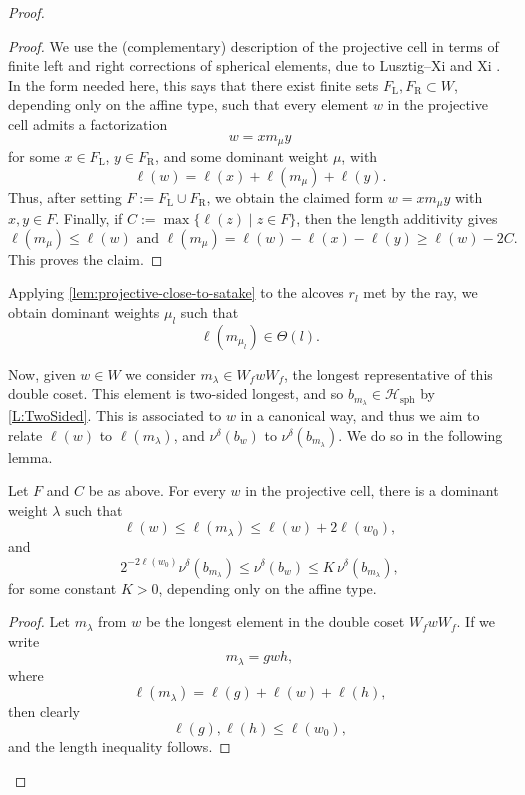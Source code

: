 \documentclass[a4paper,11pt]{amsart}
\newcommand{\Hecke}{\mc H}
\newcommand{\mc}{\mathcal}
\numberwithin{equation}{subsection}
\theoremstyle{definition}
\theoremstyle{remark}
\begin{document}
\begin{proof}
\begin{proof}
We use the (complementary) description of the projective cell in terms of finite left and
right corrections of spherical elements, due to Lusztig--Xi and Xi
\cite{LuXi-canonical-left-cells,Xi-lowest-based-ring-II}.
In the form needed here, this says that there exist finite sets
\(F_{\mathrm L},F_{\mathrm R}\subset W\), depending only on the affine type,
such that every element \(w\) in the projective cell admits a factorization
\[
w=xm_\mu y
\]
for some \(x\in F_{\mathrm L}\), \(y\in F_{\mathrm R}\), and some dominant
weight \(\mu\), with
\[
\ell(w)=\ell(x)+\ell(m_\mu)+\ell(y).
\]
Thus, after setting
$F:=F_{\mathrm L}\cup F_{\mathrm R}$,
we obtain the claimed form \(w=xm_\mu y\) with \(x,y\in F\).
Finally, if
$C:=\max\{\ell(z)\mid z\in F\}$,
then the length additivity gives
\[
\ell(m_\mu)\leq \ell(w)
\text{ and }
\ell(m_\mu)
=
\ell(w)-\ell(x)-\ell(y)
\geq \ell(w)-2C.
\]
This proves the claim.
\end{proof}

Applying \autoref{lem:projective-close-to-satake} to the alcoves \(r_l\) met
by the ray, we obtain dominant weights \(\mu_l\) such that
\[
\ell(m_{\mu_l})\in \Theta(l).
\]

Now, given $w\in W$ we consider \(m_\lambda \in W_f w W_f\), the longest representative of
this double coset. This element is two-sided longest, and so
\(b_{m_\lambda}\in \Hecke_{\mathrm{sph}}\) by 
\autoref{L:TwoSided}. This is associated to \(w\) in a canonical way,
and thus we aim to relate \(\ell(w)\) to \(\ell(m_\lambda)\), and
\(\nu^\delta(b_w)\) to \(\nu^\delta(b_{m_\lambda})\). We do so in the
following lemma.

\begin{Lemma}\label{lem:finite factor bound}
Let \(F\) and \(C\) be as above. For every \(w\) in the projective cell, there
is a dominant weight \(\lambda\) such that
\[
\ell(w)\leq \ell(m_\lambda)\leq \ell(w)+2\ell(w_0),
\]
and
\[
2^{-2\ell(w_0)}\nu^\delta(b_{m_\lambda})
\leq
\nu^\delta(b_w)
\leq
K\,\nu^\delta(b_{m_\lambda}),
\]
for some constant \(K>0\), depending only on the affine type.
\end{Lemma}

\begin{proof}
Let \(m_\lambda\) from \(w\) be the longest
element in the double coset \(W_f w W_f\). If we write
\[
m_\lambda=gwh,
\]
where
\[
\ell(m_\lambda)=\ell(g)+\ell(w)+\ell(h),
\]
then clearly
\[
\ell(g),\ell(h)\leq \ell(w_0),
\]
and the length inequality follows.


\end{proof}
\end{proof}
\end{document}
